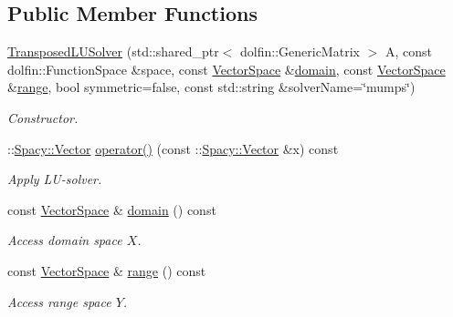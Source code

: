 \subsection*{Public Member Functions}
\begin{DoxyCompactItemize}
\item 
\hyperlink{classSpacy_1_1FEniCS_1_1TransposedLUSolver_ac27b0869e7851bafe8e161482f772b83_ac27b0869e7851bafe8e161482f772b83}{Transposed\+L\+U\+Solver} (std\+::shared\+\_\+ptr$<$ dolfin\+::\+Generic\+Matrix $>$ A, const dolfin\+::\+Function\+Space \&space, const \hyperlink{classSpacy_1_1VectorSpace}{Vector\+Space} \&\hyperlink{classSpacy_1_1OperatorBase_a2588f9b3e0188820c4c494e63293dc6f_a2588f9b3e0188820c4c494e63293dc6f}{domain}, const \hyperlink{classSpacy_1_1VectorSpace}{Vector\+Space} \&\hyperlink{classSpacy_1_1OperatorBase_ab19d3b7a6f290b1079248f1e567e53d6_ab19d3b7a6f290b1079248f1e567e53d6}{range}, bool symmetric=false, const std\+::string \&solver\+Name=\char`\"{}mumps\char`\"{})
\begin{DoxyCompactList}\small\item\em Constructor. \end{DoxyCompactList}\item 
\+::\hyperlink{classSpacy_1_1Vector}{Spacy\+::\+Vector} \hyperlink{classSpacy_1_1FEniCS_1_1TransposedLUSolver_a41e978758fb3775d56ffa32d5a05431f_a41e978758fb3775d56ffa32d5a05431f}{operator()} (const \+::\hyperlink{classSpacy_1_1Vector}{Spacy\+::\+Vector} \&x) const 
\begin{DoxyCompactList}\small\item\em Apply L\+U-\/solver. \end{DoxyCompactList}\item 
const \hyperlink{classSpacy_1_1VectorSpace}{Vector\+Space} \& \hyperlink{classSpacy_1_1OperatorBase_a2588f9b3e0188820c4c494e63293dc6f_a2588f9b3e0188820c4c494e63293dc6f}{domain} () const 
\begin{DoxyCompactList}\small\item\em Access domain space $X$. \end{DoxyCompactList}\item 
const \hyperlink{classSpacy_1_1VectorSpace}{Vector\+Space} \& \hyperlink{classSpacy_1_1OperatorBase_ab19d3b7a6f290b1079248f1e567e53d6_ab19d3b7a6f290b1079248f1e567e53d6}{range} () const 
\begin{DoxyCompactList}\small\item\em Access range space $Y$. \end{DoxyCompactList}\end{DoxyCompactItemize}


